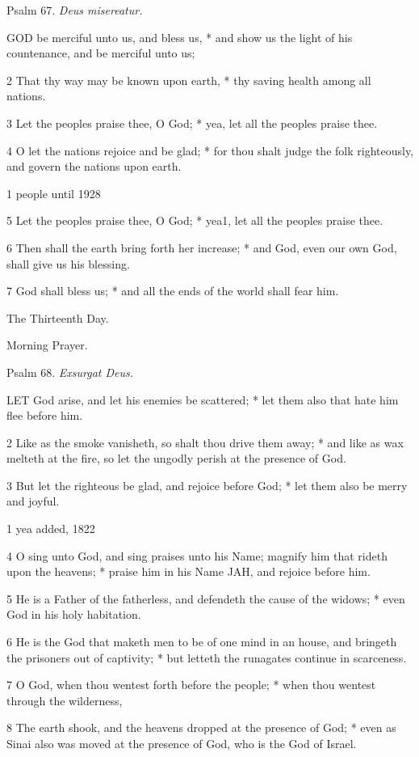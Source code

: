 Psalm
67. \emph{Deus misereatur.}

GOD
be merciful unto us, and bless us, * and show us the light of his countenance,
and be merciful unto us;

2 That thy way may be known upon earth, * thy saving
health among all nations.

3 Let the peoples praise thee, O God; * yea, let all
the peoples praise thee.

4 O let the nations rejoice and be glad; * for thou
shalt judge the folk righteously, and govern the nations upon earth.

1
people
until 1928

5 Let the peoples praise thee, O God; * yea1, let all the peoples
praise thee.

6 Then shall the earth bring forth her increase; *
and God, even our own God, shall give us his blessing.

7 God shall bless us; * and all the ends of the world
shall fear him. 

The
Thirteenth Day.

Morning
Prayer.

Psalm
68. \emph{Exsurgat Deus.}

LET
God arise, and let his enemies be scattered; * let them also that hate
him flee before him.

2 Like as the smoke vanisheth, so shalt thou drive
them away; * and like as wax melteth at the fire, so let the ungodly perish
at the presence of God.

3 But let the righteous be glad, and rejoice before
God; * let them also be merry and joyful.

1 yea
added, 1822

4 O sing unto God, and sing praises unto his Name; magnify him that rideth
upon the heavens; * praise him in his Name JAH, and rejoice before him.

5 He is a Father of the fatherless, and defendeth the
cause of the widows; * even God in his holy habitation.

6 He is the God that maketh men to be of one mind in
an house, and bringeth the prisoners out of captivity; * but letteth the
runagates continue in scarceness.

7 O God, when thou wentest forth before the people; *
when thou wentest through the wilderness,

8 The earth shook, and the heavens dropped at the presence
of God; * even as Sinai also was moved at the presence of God, who is the
God of Israel.

